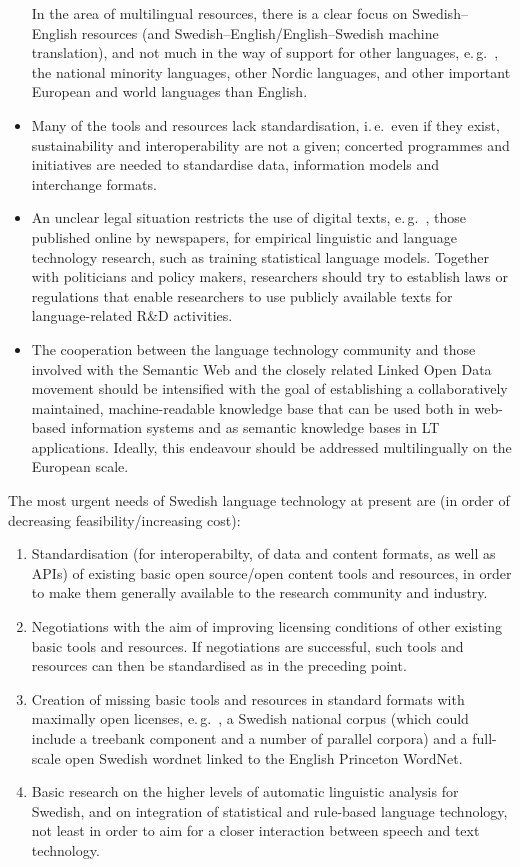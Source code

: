 \begin{multicols}{2}
\begin{itemize}
In the area of multilingual resources, there is a clear focus on
  Swedish--English resources (and Swedish--English/English--Swedish
  machine translation), and not much in the way of support for other
  languages, e.\,g.~, the national minority languages, other Nordic
  languages, and other important European and world languages than
  English.
\item Many of the tools and resources lack standardisation, i.\,e.~even
  if they exist, sustainability and interoperability are not a given;
  concerted programmes and initiatives are needed to standardise data,
  information models and interchange formats.
\item An unclear legal situation restricts the use of digital texts,
  e.\,g.~, those published online by newspapers, for empirical
  linguistic and language technology research, such as training
  statistical language models. Together with politicians and policy
  makers, researchers should try to establish laws or regulations that
  enable researchers to use publicly available texts for
  language-related R\&D activities.
\item The cooperation between the language technology community and
  those involved with the Semantic Web and the closely related Linked
  Open Data movement should be intensified with the goal of
  establishing a collaboratively maintained, machine-readable
  knowledge base that can be used both in web-based information
  systems and as semantic knowledge bases in LT applications. Ideally,
  this endeavour should be addressed multilingually on the European
  scale.
\end{itemize}

The most urgent needs of Swedish language technology at present are
(in order of decreasing feasibility/increasing cost):
\begin{enumerate}
\item Standardisation (for interoperabilty, of data and content
  formats, as well as APIs) of existing basic open source/open content
  tools and resources, in order to make them generally available to
  the research community and industry.
\item Negotiations with the aim of improving licensing conditions of
  other existing basic tools and resources. If negotiations are
  successful, such tools and resources can then be standardised as in
  the preceding point.
\item Creation of missing basic tools and resources in standard
  formats with maximally open licenses, e.\,g.~, a Swedish national
  corpus (which could include a treebank component and a number of
  parallel corpora) and a full-scale open Swedish wordnet linked to
  the English Princeton WordNet.
\item Basic research on the higher levels of automatic linguistic
  analysis for Swedish, and on integration of statistical and
  rule-based language technology, not least in order to aim for a
  closer interaction between speech and text technology.
\end{enumerate}



\end{multicols}
